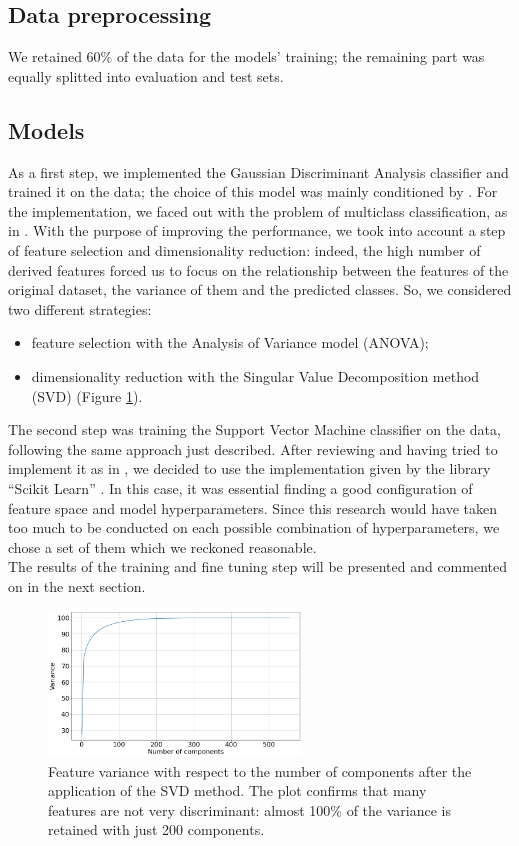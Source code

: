 \documentclass[a4paper,10pt,oneside]{article}
\begin{document}
\subsection{Data preprocessing}
We retained 60\% of the data for the models' training; the remaining part was equally splitted into evaluation and test sets.
 
\subsection{Models}
As a first step, we implemented the Gaussian Discriminant Analysis classifier and trained it on the data; the choice of this model was mainly conditioned by \cite{brown2013activity}. For the implementation, we faced out with the problem of multiclass classification, as in \cite{guillame2020, bamtak}. With the purpose of improving the performance, we took into account a step of feature selection and dimensionality reduction: indeed, the high number of derived features forced us to focus on the relationship between the features of the original dataset, the variance of them and the predicted classes. So, we considered two different strategies:
\begin{itemize}
 \item feature selection with the Analysis of Variance model (ANOVA);
 \item dimensionality reduction with the Singular Value Decomposition method (SVD) (Figure \ref{fig:var}).
\end{itemize}
The second step was training the Support Vector Machine classifier on the data, following the same approach just described. After reviewing \cite{james2013introduction, aggarwal2015data, ma_ng_re_2009, bishop2006pattern} and having tried to implement it as in \cite{platt1998sequential, kowalczyk2017support}, we decided to use the implementation given by the library “Scikit Learn” \cite{scikit-learn, sklearn_api}. In this case, it was essential finding a good configuration of feature space and model hyperparameters. Since this research would have taken too much to be conducted on each possible combination of hyperparameters, we chose a set of them which we reckoned reasonable.\\ The results of the training and fine tuning step will be presented and commented on in the next section.


\begin{figure}
 \center
 \includegraphics[width=0.6\textwidth]{components_variance}
 \caption{Feature variance with respect to the number of components after the application of the SVD method. The plot confirms that many features are not very discriminant: almost 100\% of the variance is retained with just 200 components.}
 \label{fig:var}
\end{figure}
\end{document}
